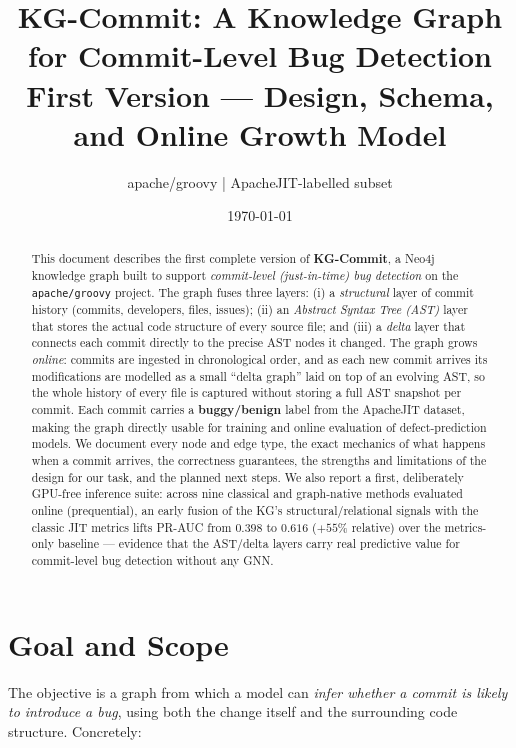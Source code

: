 \documentclass[11pt,a4paper]{article}
\title{\textbf{KG-Commit: A Knowledge Graph for Commit-Level Bug Detection}\\
\large First Version --- Design, Schema, and Online Growth Model}
\author{apache/groovy \;|\; ApacheJIT-labelled subset}
\date{\today}
\begin{document}
\maketitle

\begin{abstract}
This document describes the first complete version of \textbf{KG-Commit}, a
Neo4j knowledge graph built to support \emph{commit-level (just-in-time) bug
detection} on the \texttt{apache/groovy} project. The graph fuses three layers:
(i) a \emph{structural} layer of commit history (commits, developers, files,
issues); (ii) an \emph{Abstract Syntax Tree (AST)} layer that stores the actual
code structure of every source file; and (iii) a \emph{delta} layer that
connects each commit directly to the precise AST nodes it changed. The graph
grows \emph{online}: commits are ingested in chronological order, and as each
new commit arrives its modifications are modelled as a small ``delta graph''
laid on top of an evolving AST, so the whole history of every file is captured
without storing a full AST snapshot per commit. Each commit carries a
\textbf{buggy/benign} label from the ApacheJIT dataset, making the graph
directly usable for training and online evaluation of defect-prediction models.
We document every node and edge type, the exact mechanics of what happens when a
commit arrives, the correctness guarantees, the strengths and limitations of the
design for our task, and the planned next steps. We also report a first,
deliberately GPU-free inference suite: across nine classical and graph-native
methods evaluated online (prequential), an early fusion of the KG's
structural/relational signals with the classic JIT metrics lifts PR-AUC from
$0.398$ to $0.616$ ($+55\%$ relative) over the metrics-only baseline ---
evidence that the AST/delta layers carry real predictive value for commit-level
bug detection without any GNN.
\end{abstract}

\tableofcontents
\bigskip

\section{Goal and Scope}
The objective is a graph from which a model can \emph{infer whether a commit is
likely to introduce a bug}, using both the change itself and the surrounding
code structure. Concretely:
\end{document}
